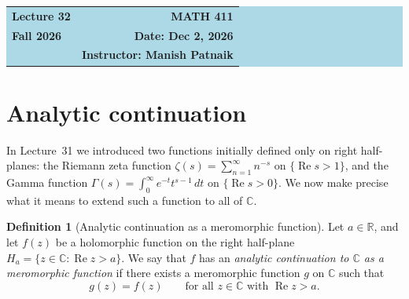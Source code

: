\documentclass[11pt]{article}
\theoremstyle{plain}
\theoremstyle{definition}
\newtheorem{definition}[theorem]{Definition}
\theoremstyle{boldremark}
\theoremstyle{remark}
\numberwithin{equation}{section}
\newcommand{\C}{\mathbb{C}}
\newcommand{\R}{\mathbb{R}}
\DeclareMathOperator{\Real}{Re}
\begin{document}
\begin{center}
  \colorbox{lightblue}{%
    \begin{minipage}{0.94\textwidth}
      \vspace{0.55em}
      \begin{tabular*}{\textwidth}{@{\extracolsep{\fill}}lr}
        {\color{courseblue}\bfseries\LARGE Lecture 32} &
        {\color{courseblue}\bfseries\LARGE MATH 411}\\[0.35em]
        \textbf{Fall 2026} & \textbf{Date: Dec 2, 2026}\\
        & \textbf{Instructor: Manish Patnaik}
      \end{tabular*}
      \vspace{0.45em}
    \end{minipage}}
\end{center}

\setcounter{tocdepth}{1}
\tableofcontents
\vspace{0.45em}

\section{Analytic continuation}

In Lecture~31 we introduced two functions initially defined only on right
half-planes: the Riemann zeta function $\zeta(s)=\sum_{n=1}^{\infty} n^{-s}$
on $\{\Real s > 1\}$, and the Gamma function
$\Gamma(s)=\int_0^{\infty} e^{-t}t^{s-1}\,dt$ on $\{\Real s > 0\}$. We now
make precise what it means to extend such a function to all of $\C$.

\begin{definition}[Analytic continuation as a meromorphic function]
Let $a\in\R$, and let $f(z)$ be a holomorphic function on the right
half-plane $H_a=\{z\in\C:\Real z > a\}$. We say that $f$ has an
\emph{analytic continuation to $\C$ as a meromorphic function} if there
exists a meromorphic function $g$ on $\C$ such that
\[
 g(z) = f(z) \qquad \text{for all } z\in\C \text{ with } \Real z > a.
\]
\end{definition}
\end{document}
